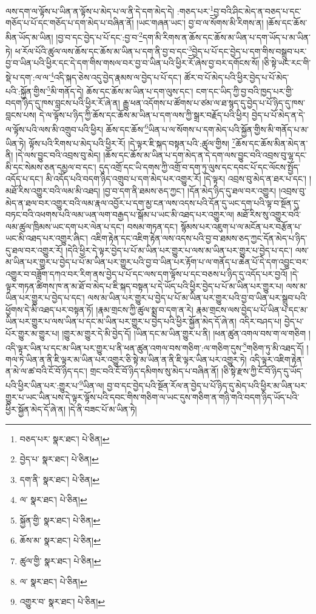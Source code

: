 ལས་དག་ལ་ལྟོས་པ་ཡིན་ན་ལྟོས་པ་མེད་པ་ལ་ནི་དེ་དག་མེད་དེ། :གཅད་པར་\footnote{བཅད་པར་  སྣར་ཐང་།  པེ་ཅིན། }བྱ་བའི་ཤིང་མེད་ན་བཅད་པ་དང་གཅོད་པ་པོ་དང་གཅོད་པ་དག་མེད་པ་བཞིན་ནོ། །ཡང་གཞན་ཡང་། བྱ་བ་ལ་སོགས་མི་རིགས་ན། །ཆོས་དང་ཆོས་མིན་ཡོད་མ་ཡིན། །བྱ་བ་དང་བྱེད་པ་པོ་དང་:བྱ་བ་\footnote{བྱེད་པ་  སྣར་ཐང་།  པེ་ཅིན། }དག་མི་རིགས་ན་ཆོས་དང་ཆོས་མ་ཡིན་པ་དག་ཡོད་པ་མ་ཡིན་ཏེ། ཕ་རོལ་པོའི་ཚུལ་ལས་ཆོས་དང་ཆོས་མ་ཡིན་པ་དག་ནི་བྱ་བ་དང་\footnote{དག་ནི་  སྣར་ཐང་།  པེ་ཅིན། }བྱེད་པ་པོ་དང་བྱེད་པ་དག་གིས་བསྒྲུབ་པར་བྱ་བ་ཡིན་པའི་ཕྱིར་དང་དེ་དག་གིས་གསལ་བར་བྱ་བ་ཡིན་པའི་ཕྱིར་རོ་ཞེས་བྱ་བར་དགོངས་སོ། །ཅི་སྟེ་ཡང་རང་གི་སྡེ་པ་དག་:ལ་ལ་\footnote{ལ་  སྣར་ཐང་།  པེ་ཅིན། }འདི་སྐད་ཅེས་འདུ་བྱེད་རྣམས་ལ་བྱེད་པ་པོ་དང་། ཚོར་བ་པོ་མེད་པའི་ཕྱིར་བྱེད་པ་པོ་མེད་པའི་:སྐྱོན་གྱིས་\footnote{སྐྱོན་གྱི་  སྣར་ཐང་།  པེ་ཅིན། }མི་གནོད་དེ། ཆོས་དང་ཆོས་མ་ཡིན་པ་དག་ལུས་དང་། ངག་དང་ཡིད་ཀྱི་བྱ་བའི་ཁྱད་པར་གྱི་བདག་ཉིད་དུ་ཁས་བླངས་པའི་ཕྱིར་རོ་ཞེ་ན། རྒྱུ་ཕན་འདོགས་པ་ཚོགས་པ་ཙམ་ལ་ཐ་སྙད་དུ་བྱེད་པ་པོ་ཉིད་དུ་ཁས་བླངས་པས། དེ་ལ་ལྟོས་པ་ཉིད་ཀྱི་ཆོས་དང་ཆོས་མ་ཡིན་པ་དག་ལས་ཀྱི་སྒྲར་བརྗོད་པའི་ཕྱིར། བྱེད་པ་པོ་མེད་ན་དེ་ལ་ལྟོས་པའི་ལས་མི་འགྲུབ་པའི་ཕྱིར། ཆོས་དང་ཆོས་\footnote{ཆོས་མ་  སྣར་ཐང་།  པེ་ཅིན། }ཡིན་པ་ལ་སོགས་པ་དག་མེད་པའི་སྐྱོན་གྱིས་མི་གནོད་པ་མ་ཡིན་ཏེ། ལྟོས་པའི་རིགས་པ་མེད་པའི་ཕྱིར་རོ། །དེ་ལྟར་ཇི་སྐད་བསྟན་པའི་:ཚུལ་གྱིས། \footnote{ཚུལ་གྱི་  སྣར་ཐང་།  པེ་ཅིན། }ཆོས་དང་ཆོས་མིན་མེད་ན་ནི། །དེ་ལས་བྱུང་བའི་འབྲས་བུ་མེད། །ཆོས་དང་ཆོས་མ་ཡིན་པ་དག་མེད་ན་དེ་དག་ལས་བྱུང་བའི་འབྲས་བུ་ལྷ་དང་མི་དང་སེམས་ཅན་དམྱལ་བ་དང་། དུད་འགྲོ་དང་ཡི་དགས་ཀྱི་འགྲོ་བ་དག་ཏུ་ལུས་དང་དབང་པོ་དང་ལོངས་སྤྱོད་འདོད་པ་དང་། མི་འདོད་པའི་བདག་ཉིད་འགྲུབ་པ་དག་མེད་པར་འགྱུར་རོ། །དེ་ལྟར། འབྲས་བུ་མེད་ན་ཐར་པ་དང་། །མཐོ་རིས་འགྱུར་བའི་ལམ་མི་འཐད། །བྱ་བ་དག་ནི་ཐམས་ཅད་ཀྱང་། །དོན་མེད་ཉིད་དུ་ཐལ་བར་འགྱུར། །འབྲས་བུ་མེད་ན་ཐལ་བར་འགྱུར་བའི་ལམ་རྣལ་འབྱོར་པ་དག་མྱ་ངན་ལས་འདས་པའི་དོན་དུ་ཡང་དག་པའི་ལྟ་བ་སྔོན་དུ་བཏང་བའི་འཕགས་པའི་ལམ་ཡན་ལག་བརྒྱད་པ་སྒོམ་པ་ཡང་མི་འཐད་པར་འགྱུར་ལ། མཐོ་རིས་སུ་འགྱུར་བའི་ལམ་ཚུལ་ཁྲིམས་ཡང་དག་པར་ལེན་པ་དང་། བསམ་གཏན་དང་། སྙོམས་པར་འཇུག་པ་ལ་མངོན་པར་བརྩོན་པ་ཡང་མི་འཐད་པར་འགྱུར་ཞིང་། འཇིག་རྟེན་དང་འཇིག་རྟེན་ལས་འདས་པའི་བྱ་བ་ཐམས་ཅད་ཀྱང་དོན་མེད་པ་ཉིད་དུ་ཐལ་བར་འགྱུར་རོ། །དེའི་ཕྱིར་དེ་ལྟར་བྱེད་པ་པོ་མ་ཡིན་པར་གྱུར་པ་ལས་མ་ཡིན་པར་གྱུར་པ་བྱེད་པ་དང་། ལས་མ་ཡིན་པར་གྱུར་པ་བྱེད་པ་པོ་མ་ཡིན་པར་གྱུར་པའི་བྱ་བ་ཡིན་པར་རྟོག་པ་ལ་གནོད་པ་ཆེན་པོ་དེ་དག་འབྱུང་བར་འགྱུར་བ་བཟློག་དཀའ་བར་རིག་ནས་བྱེད་པ་པོ་དང་ལས་དག་ལྟོས་པ་དང་བཅས་པ་ཉིད་དུ་འདོད་པར་བྱའོ། །དེ་ལྟར་གཏན་ཚིགས་ཁ་ན་མ་ཐོ་བ་མེད་པ་ཇི་སྐད་བསྟན་པ་དེ་ཡོད་པའི་ཕྱིར་བྱེད་པ་པོ་མ་ཡིན་པར་གྱུར་པ། ལས་མ་ཡིན་པར་གྱུར་པ་བྱེད་པ་དང་། ལས་མ་ཡིན་པར་གྱུར་པ་བྱེད་པ་པོ་མ་ཡིན་པར་གྱུར་པའི་བྱ་བ་ཡིན་པར་སྒྲུབ་པའི་ཕྱོགས་དེ་མི་འཐད་པར་བསྟན་ཏོ། །རྣམ་གྲངས་ཀྱི་ཚུལ་སྨྲ་བ་དག་ན་རེ། རྣམ་གྲངས་ལས་བྱེད་པ་པོ་ཡིན་པ་དང་མ་ཡིན་པར་གྱུར་པ་ལས་ཡིན་པ་དང་མ་ཡིན་པར་གྱུར་པ་བྱེད་པའི་ཕྱིར་སྐྱོན་མེད་དོ་ཞེ་ན། འདིར་བཤད་པ། བྱེད་པ་པོར་གྱུར་མ་གྱུར་པ། །གྱུར་མ་གྱུར་དེ་མི་བྱེད་དོ། །ཡིན་དང་མ་ཡིན་གྱུར་པ་ནི། །ཕན་ཚུན་འགལ་བས་ག་ལ་གཅིག །འདི་ལྟར་ཡིན་པ་དང་མ་ཡིན་པར་གྱུར་པ་ནི་ཕན་ཚུན་འགལ་བས་གཅིག་:ལ་གཅིག་དུས་\footnote{ལ་  སྣར་ཐང་།  པེ་ཅིན། }གཅིག་ཏུ་མི་འཐད་དོ། །གལ་ཏེ་ཡིན་ན་ནི་ཇི་ལྟར་མ་ཡིན་པར་འགྱུར་ཅི་སྟེ་མ་ཡིན་ན་ནི་ཇི་ལྟར་ཡིན་པར་འགྱུར་ཏེ། འདི་ལྟར་འཇིག་རྟེན་ན་མེ་ལ་ཚ་བའི་ངོ་བོ་ཉིད་དང་། གྲང་བའི་ངོ་བོ་ཉིད་དམིགས་སུ་མེད་པ་བཞིན་ནོ། །ཅི་སྟེ་རྫས་ཀྱི་ངོ་བོ་ཉིད་དུ་ཡོད་པའི་ཕྱིར་ཡིན་པར་:གྱུར་པ་\footnote{འགྱུར་བ་  སྣར་ཐང་།  པེ་ཅིན། }ཡིན་ལ། བྱ་བ་དང་བྱེད་པའི་སྔོན་རོལ་ན་བྱེད་པ་པོ་ཉིད་དུ་མེད་པའི་ཕྱིར་མ་ཡིན་པར་གྱུར་པ་ཡང་ཡིན་པས་དེ་ལྟར་ལྟོས་པའི་དབང་གིས་གཅིག་ལ་ཡང་དུས་གཅིག་ན་གཉི་གའི་བདག་ཉིད་ཡོད་པའི་ཕྱིར་སྐྱོན་མེད་དོ་ཞེ་ན། །དེ་ནི་བཟང་པོ་མ་ཡིན་ཏེ། 